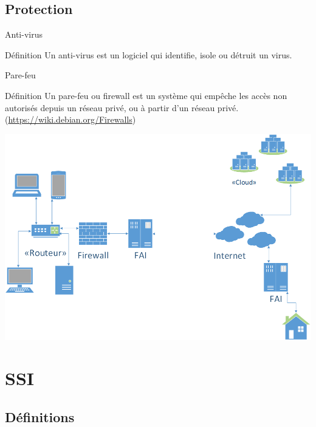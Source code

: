 \documentclass[12pt]{beamer}
\begin{document}
	\subsection{Protection}
	
		\begin{frame}{Anti-virus}
			\begin{exampleblock}{Définition}
				Un \alert{anti-virus} est un logiciel qui identifie, isole ou détruit un virus.
			\end{exampleblock}
		\end{frame}

		\begin{frame}{Pare-feu}
			\begin{exampleblock}{Définition}
				Un \alert{pare-feu} ou \alert{firewall} est un système qui empêche les accès non autorisés depuis un réseau privé, ou à partir d'un réseau privé. (\url{https://wiki.debian.org/Firewalls})
			\end{exampleblock}
		\end{frame}
		
		\begin{frame}{}
			\begin{center}
				\includegraphics[scale=.35]{LAN-WAN.png}
			\end{center}
		\end{frame}


\section{SSI}
	
	\subsection{Définitions}
\end{document}
